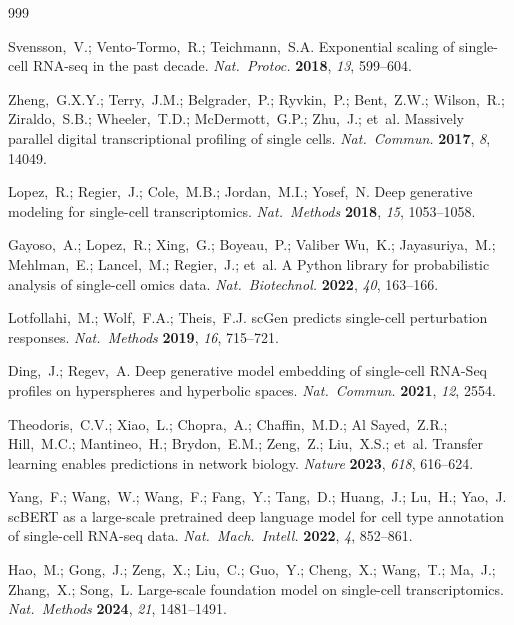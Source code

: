 \documentclass[preprint,12pt]{elsarticle}
\begin{document}
\begin{thebibliography}{999}
\setlength{\itemsep}{0pt}\setlength{\parskip}{0pt}\setlength{\parsep}{0pt}

Svensson,~V.; Vento-Tormo,~R.; Teichmann,~S.A. Exponential scaling of single-cell RNA-seq in the past decade. {\em Nat.\ Protoc.} {\bf 2018}, {\em 13}, 599--604.

Zheng,~G.X.Y.; Terry,~J.M.; Belgrader,~P.; Ryvkin,~P.; Bent,~Z.W.; Wilson,~R.; Ziraldo,~S.B.; Wheeler,~T.D.; McDermott,~G.P.; Zhu,~J.; et~al. Massively parallel digital transcriptional profiling of single cells. {\em Nat.\ Commun.} {\bf 2017}, {\em 8}, 14049.

Lopez,~R.; Regier,~J.; Cole,~M.B.; Jordan,~M.I.; Yosef,~N. Deep generative modeling for single-cell transcriptomics. {\em Nat.\ Methods} {\bf 2018}, {\em 15}, 1053--1058.

Gayoso,~A.; Lopez,~R.; Xing,~G.; Boyeau,~P.; Valiber Wu,~K.; Jayasuriya,~M.; Mehlman,~E.; Lancel,~M.; Regier,~J.; et~al. A Python library for probabilistic analysis of single-cell omics data. {\em Nat.\ Biotechnol.} {\bf 2022}, {\em 40}, 163--166.

Lotfollahi,~M.; Wolf,~F.A.; Theis,~F.J. scGen predicts single-cell perturbation responses. {\em Nat.\ Methods} {\bf 2019}, {\em 16}, 715--721.

Ding,~J.; Regev,~A. Deep generative model embedding of single-cell RNA-Seq profiles on hyperspheres and hyperbolic spaces. {\em Nat.\ Commun.} {\bf 2021}, {\em 12}, 2554.

Theodoris,~C.V.; Xiao,~L.; Chopra,~A.; Chaffin,~M.D.; Al Sayed,~Z.R.; Hill,~M.C.; Mantineo,~H.; Brydon,~E.M.; Zeng,~Z.; Liu,~X.S.; et~al. Transfer learning enables predictions in network biology. {\em Nature} {\bf 2023}, {\em 618}, 616--624.

Yang,~F.; Wang,~W.; Wang,~F.; Fang,~Y.; Tang,~D.; Huang,~J.; Lu,~H.; Yao,~J. scBERT as a large-scale pretrained deep language model for cell type annotation of single-cell RNA-seq data. {\em Nat.\ Mach.\ Intell.} {\bf 2022}, {\em 4}, 852--861.

Hao,~M.; Gong,~J.; Zeng,~X.; Liu,~C.; Guo,~Y.; Cheng,~X.; Wang,~T.; Ma,~J.; Zhang,~X.; Song,~L. Large-scale foundation model on single-cell transcriptomics. {\em Nat.\ Methods} {\bf 2024}, {\em 21}, 1481--1491.


\end{thebibliography}
\end{document}
